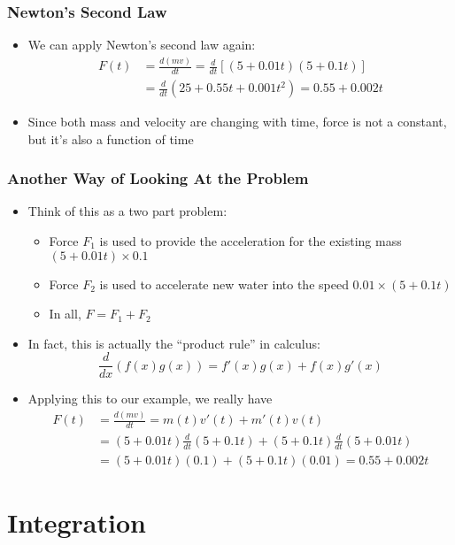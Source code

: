 \documentclass[12pt,compress,aspectratio=169]{beamer}
\begin{document}
\begin{frame}
  \frametitle{Newton's Second Law}
  \begin{itemize}
  \item We can apply Newton's second law again:
    \begin{align*}
      F(t)&=\frac{d(mv)}{dt}=\frac{d}{dt}\left[(5+0.01t)(5+0.1t)\right]\\
      &=\frac{d}{dt}\left(25+0.55t+0.001t^2 \right)=0.55+0.002t
    \end{align*}
  \item Since both mass and velocity are changing with time, force is not a
    constant, but it's also a function of time
  \end{itemize}
\end{frame}

\begin{frame}
  \frametitle{Another Way of Looking At the Problem}
  \begin{itemize}
  \item Think of this as a two part problem:
    \begin{itemize}
    \item Force $F_1$ is used to provide the acceleration for the existing mass
      $(5+0.01t)\times 0.1$
    \item Force $F_2$ is used to accelerate new water into the speed
      $0.01\times (5+0.1t)$
    \item In all, $F=F_1+F_2$
    \end{itemize}
  \item In fact, this is actually the ``product rule'' in calculus:
    {\large
      \begin{displaymath}
        \frac{d}{dx}\left(f(x)g(x)\right)=
        f'(x)g(x)+f(x)g'(x)
      \end{displaymath}
    }
  \item Applying this to our example, we really have
    \begin{align*}
      F(t)&=\frac{d(mv)}{dt}=m(t)v'(t)+m'(t)v(t)\\
      &=(5+0.01t)\frac{d}{dt}(5+0.1t)+(5+0.1t)\frac{d}{dt}(5+0.01t)\\
      &=(5+0.01t)(0.1)+ (5+0.1t)(0.01)=0.55+0.002t
    \end{align*}
  \end{itemize}
\end{frame}


\section{Integration}
\end{document}
